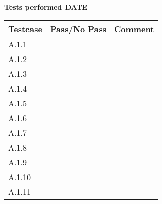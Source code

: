 \renewcommand{\testdate}{DATE}
\textbf{ Tests performed \testdate}
\begin{center}
  		\begin{tabular}{| p{3cm} | p{5cm} | p{5cm} |}
    		\hline
	    	\textbf{Testcase}			& \textbf{Pass/No Pass} 	& \textbf{Comment} \\ \hline
    		A.1.1		 						&  										&  \\ \hline
    		A.1.2		 						&  										& 				 \\	\hline
    		A.1.3		 						&  										& 				 \\	\hline
    		A.1.4		 						&  										& 				 \\	\hline
    		A.1.5		 						&  										& 				 \\	\hline
    		A.1.6		 						&  										& 				 \\	\hline
    		A.1.7		 						&  										& 				 \\	\hline
    		A.1.8		 						&  										& 				 \\	\hline
    		A.1.9		 						&  										& 				 \\	\hline
    		A.1.10	 							&  										& 				 \\	\hline
    		A.1.11	 							&  										& 				 \\	\hline
 		 \end{tabular}
\end{center}
	